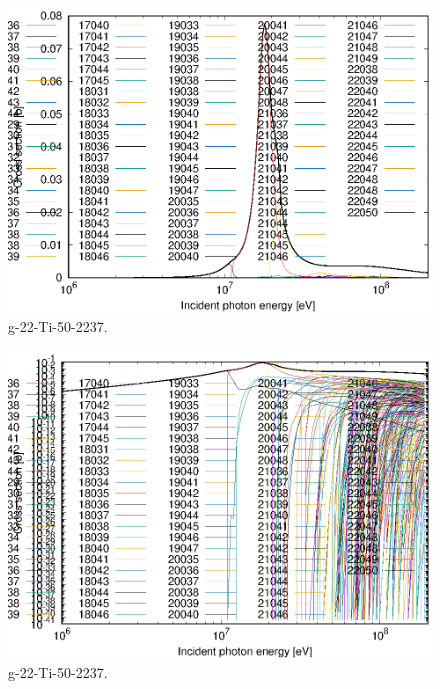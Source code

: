 \begin{figure}
 \includegraphics[width=\linewidth]{eps/g_22-Ti-50_2237.eps}
  \caption{g-22-Ti-50-2237.}
\end{figure}
\begin{figure}
 \includegraphics[width=\linewidth]{eps-log/g_22-Ti-50_2237.eps}
 \caption{g-22-Ti-50-2237.}
\end{figure}
\newpage \clearpage

